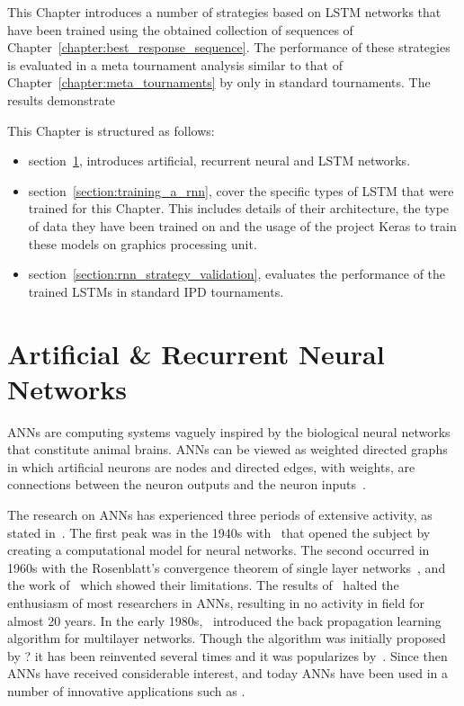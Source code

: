 This Chapter introduces a number of strategies based on LSTM networks that have
been trained using the obtained collection of sequences of
Chapter~\ref{chapter:best_response_sequence}. The performance of these strategies
is evaluated in a meta tournament analysis similar to that of
Chapter~\ref{chapter:meta_tournaments} by only in standard tournaments. The
results demonstrate %

This Chapter is structured as follows:

\begin{itemize}
    \item section~\ref{section:artificial_neural_networks}, introduces
    artificial, recurrent neural and LSTM networks.
    \item section~\ref{section:training_a_rnn}, cover the specific types of LSTM
    that were trained for this Chapter. This includes details of their
    architecture, the type of data they have been trained on and the usage of
    the project Keras to train these models on graphics processing unit.
    \item section~\ref{section:rnn_strategy_validation}, evaluates the
    performance of the trained LSTMs in \metatournamentslstm standard IPD
    tournaments.
\end{itemize}

\section{Artificial \& Recurrent Neural Networks}\label{section:artificial_neural_networks}

ANNs are computing systems vaguely inspired by the
biological neural networks that constitute animal brains. ANNs can be viewed as
weighted directed graphs in which artificial neurons are nodes and directed
edges, with weights, are connections between the neuron outputs and the neuron
inputs~\cite{Jain1996}.

The research on ANNs has experienced three periods of extensive activity, as
stated in~\cite{Jain1996}. The first peak was in the 1940s
with~\cite{McCulloch1943} that opened the subject by creating a computational
model for neural networks. The second occurred in 1960s with the Rosenblatt's
convergence theorem of single layer networks~\cite{Rosenblatt1961}, and
the work of~\cite{Minsky1969} which showed their limitations.
The results of~\cite{Minsky1969} halted the enthusiasm of most
researchers in ANNs, resulting in no activity in field for almost 20 years. In
the early 1980s,~\cite{Werbos1974} introduced the back propagation learning
algorithm for multilayer networks. Though the algorithm was
initially proposed by ? it has been reinvented several times and it was
popularizes by~\cite{McClelland1986}. Since then ANNs have received considerable
interest, and today ANNs have been used in a number of innovative applications
such as \cite{Covington2016, Kalogirou2000}.

